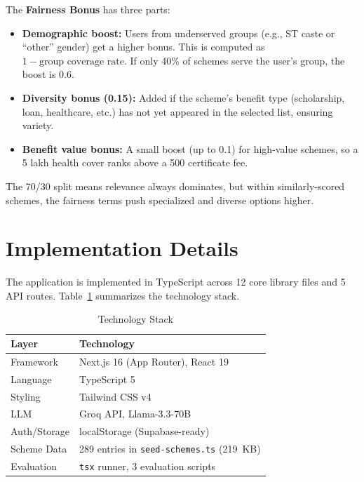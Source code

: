\documentclass[conference]{IEEEtran}
\newcommand{\rupee}{\textrm{\textup{\text{\textrm{Rs.}}}}}
\begin{document}
The \textbf{Fairness Bonus} has three parts:
\begin{itemize}
    \item \textbf{Demographic boost:} Users from underserved groups (e.g., ST caste or ``other'' gender) get a higher bonus. This is computed as $1 - \text{group coverage rate}$. If only 40\% of schemes serve the user's group, the boost is 0.6.
    \item \textbf{Diversity bonus (0.15):} Added if the scheme's benefit type (scholarship, loan, healthcare, etc.) has not yet appeared in the selected list, ensuring variety.
    \item \textbf{Benefit value bonus:} A small boost (up to 0.1) for high-value schemes, so a \rupee5 lakh health cover ranks above a \rupee500 certificate fee.
\end{itemize}

The 70/30 split means relevance always dominates, but within similarly-scored schemes, the fairness terms push specialized and diverse options higher.

\section{Implementation Details}

The application is implemented in TypeScript across 12 core library files and 5 API routes. Table~\ref{tab:stack} summarizes the technology stack.

\begin{table}[t]
\centering
\caption{Technology Stack}
\label{tab:stack}
\begin{tabular}{@{}ll@{}}
\toprule
\textbf{Layer} & \textbf{Technology} \\
\midrule
Framework & Next.js 16 (App Router), React 19 \\
Language & TypeScript 5 \\
Styling & Tailwind CSS v4 \\
LLM & Groq API, Llama-3.3-70B \\
Auth/Storage & localStorage (Supabase-ready) \\
Scheme Data & 289 entries in \texttt{seed-schemes.ts} (219~KB) \\
Evaluation & \texttt{tsx} runner, 3 evaluation scripts \\
\bottomrule
\end{tabular}
\end{table}
\end{document}
